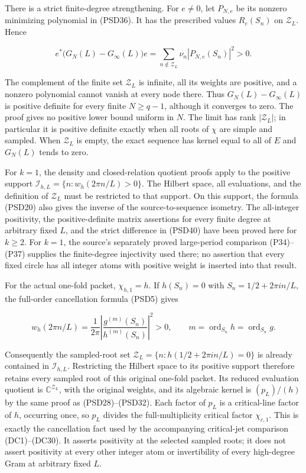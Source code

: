 There is a strict finite-degree strengthening. For \(e \ne  0\), let \(P_{N,e}\) be its nonzero minimizing polynomial in (PSD36). It has the prescribed values \(R_e(S_n)\) on \(\mathcal Z_L\). Hence

\[
e^*\bigl(G_N(L)-G_\infty(L)\bigr)e
=\sum_{n\notin\mathcal Z_L}\nu_n|P_{N,e}(S_n)|^2>0.
\tag{PSD40}
\]

The complement of the finite set \(\mathcal Z_L\) is infinite, all its weights are positive, and a nonzero polynomial cannot vanish at every node there. Thus \(G_N(L)-G_\infty(L)\) is positive definite for every finite \(N\ge q-1\), although it converges to zero. The proof gives no positive lower bound uniform in \(N\). The limit has rank \(|\mathcal Z_L|\); in particular it is positive definite exactly when all roots of \(\chi\) are simple and sampled. When \(\mathcal Z_L\) is empty, the exact sequence has kernel equal to all of \(E\) and \(G_N(L)\) tends to zero.

For \(k=1\), the density and closed-relation quotient proofs apply to the positive support \(\mathcal I_{h,L}=\{n:w_h(2\pi n/L)>0\}\). The Hilbert space, all evaluations, and the definition of \(\mathcal Z_L\) must be restricted to that support. On this support, the formula (PSD20) also gives the inverse of the source-to-sequence isometry. The all-integer positivity, the positive-definite matrix assertions for every finite degree at arbitrary fixed \(L\), and the strict difference in (PSD40) have been proved here for \(k\ge2\). For \(k=1\), the source's separately proved large-period comparison (P34)--(P37) supplies the finite-degree injectivity used there; no assertion that every fixed circle has all integer atoms with positive weight is inserted into that result.

For the actual one-fold packet, \(\chi_{h,1}=h\). If \(h(S_n)=0\) with \(S_n=1/2+2\pi i n/L\), the full-order cancellation formula (PSD5) gives

\[
w_h(2\pi n/L)=\frac1{2\pi}
\left|\frac{g^{(m)}(S_n)}{h^{(m)}(S_n)}\right|^2>0,
\qquad m=\operatorname{ord}_{S_n}h=\operatorname{ord}_{S_n}g.
\tag{PSD41}
\]

Consequently the sampled-root set \(\mathcal Z_L=\{n:h(1/2+2\pi i n/L)=0\}\) is already contained in \(\mathcal I_{h,L}\). Restricting the Hilbert space to its positive support therefore retains every sampled root of this original one-fold packet. Its reduced evaluation quotient is \(\mathbb C^{\mathcal Z_L}\), with the original weights, and its algebraic kernel is \((p_L)/(h)\) by the same proof as (PSD28)--(PSD32). Each factor of \(p_L\) is a critical-line factor of \(h\), occurring once, so \(p_L\) divides the full-multiplicity critical factor \(\chi_{c,1}\). This is exactly the cancellation fact used by the accompanying critical-jet comparison (DC1)--(DC30). It asserts positivity at the selected sampled roots; it does not assert positivity at every other integer atom or invertibility of every high-degree Gram at arbitrary fixed \(L\).


\endgroup
